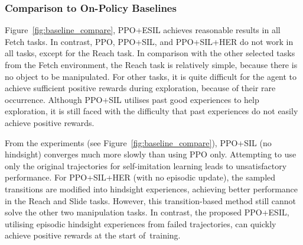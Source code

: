 \subsubsection{Comparison to On-Policy Baselines}
{Figure~\ref{fig:baseline_compare}, PPO+ESIL} achieves reasonable results in all Fetch tasks. {In contrast}, PPO, PPO+SIL, and PPO+SIL+HER do not work in all tasks, except for the Reach task. In comparison with the other selected tasks from the Fetch environment, the Reach task is relatively simple, because there is no object to be manipulated. For other tasks, it is quite difficult for the agent to achieve sufficient positive rewards during exploration, because of their rare occurrence. Although PPO+SIL utilises past good experiences to help exploration, it is still faced with the difficulty that past experiences do not easily achieve positive rewards. 

From the experiments ({see Figure~\ref{fig:baseline_compare}}), PPO+SIL (no hindsight) converges much more slowly than using PPO only. Attempting to use only the original trajectories for self-imitation learning leads to unsatisfactory performance. For PPO+SIL+HER (with no episodic update), the sampled transitions are modified into hindsight experiences, achieving better performance in the Reach and Slide tasks. However, this transition-based method still cannot solve the other two manipulation tasks. In contrast, the proposed PPO+ESIL, utilising episodic hindsight experiences from failed trajectories, can quickly achieve positive rewards at the start of~training.

